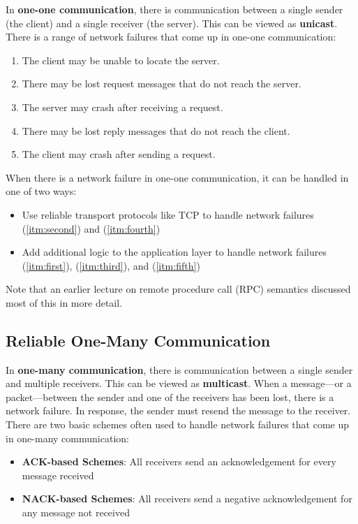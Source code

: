 \documentclass[twoside]{article}
\begin{document}
In \textbf{one-one communication}, there is communication between a single sender (the client) and a single receiver (the server). This can be viewed as \textbf{unicast}. There is a range of network failures that come up in one-one communication:
\begin{enumerate}
    \item \label{itm:first} The client may be unable to locate the server.
    \item \label{itm:second} There may be lost request messages that do not reach the server.
    \item \label{itm:third} The server may crash after receiving a request.
    \item \label{itm:fourth} There may be lost reply messages that do not reach the client.
    \item \label{itm:fifth} The client may crash after sending a request.
\end{enumerate}
When there is a network failure in one-one communication, it can be handled in one of two ways:
\begin{itemize}
    \item Use reliable transport protocols like TCP to handle network failures (\ref{itm:second}) and (\ref{itm:fourth})
    \item Add additional logic to the application layer to handle network failures (\ref{itm:first}), (\ref{itm:third}), and (\ref{itm:fifth})
\end{itemize}
Note that an earlier lecture on remote procedure call (RPC) semantics discussed most of this in more detail. 

\subsection{Reliable One-Many Communication}

In \textbf{one-many communication}, there is communication between a single sender and multiple receivers. This can be viewed as \textbf{multicast}. When a message---or a packet---between the sender and one of the receivers has been lost, there is a network failure. In response, the sender must resend the message to the receiver. There are two basic schemes often used to handle network failures that come up in one-many communication:
\begin{itemize}
    \item \textbf{ACK-based Schemes}: All receivers send an acknowledgement for every message received
    \item \textbf{NACK-based Schemes}: All receivers send a negative acknowledgement for any message not received
\end{itemize}
\end{document}
